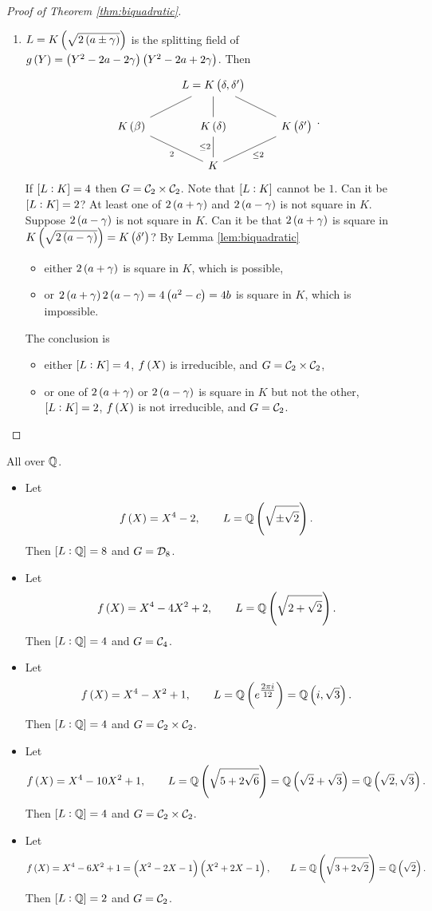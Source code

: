 \begin{proof}[Proof of Theorem \ref{thm:biquadratic}]
\begin{enumerate}
\item $ L = K\br{\sqrt{2\br{a \pm \gamma}}} $ is the splitting field of $ g\br{Y} = \br{Y^2 - 2a - 2\gamma}\br{Y^2 - 2a + 2\gamma} $. Then
$$
\begin{tikzcd}
& L = K\br{\delta, \delta'} & \\
K\br{\beta} \arrow[dash]{ur} & K\br{\delta} \arrow[dash]{u} & K\br{\delta'} \arrow[dash]{ul} \\
& K \arrow[dash]{ul}{2} \arrow[dash]{u}{\le 2} \arrow[dash]{ur}[swap]{\le 2} &
\end{tikzcd}.
$$
If $ \sbr{L : K} = 4 $ then $ G = \mathcal{C}_2 \times \mathcal{C}_2 $. Note that $ \sbr{L : K} $ cannot be $ 1 $. Can it be $ \sbr{L : K} = 2 $? At least one of $ 2\br{a + \gamma} $ and $ 2\br{a - \gamma} $ is not square in $ K $. Suppose $ 2\br{a - \gamma} $ is not square in $ K $. Can it be that $ 2\br{a + \gamma} $ is square in $ K\br{\sqrt{2\br{a - \gamma}}} = K\br{\delta'} $? By Lemma \ref{lem:biquadratic}
\begin{itemize}
\item either $ 2\br{a + \gamma} $ is square in $ K $, which is possible,
\item or $ 2\br{a + \gamma}2\br{a - \gamma} = 4\br{a^2 - c} = 4b $ is square in $ K $, which is impossible.
\end{itemize}
The conclusion is
\begin{itemize}
\item either $ \sbr{L : K} = 4 $, $ f\br{X} $ is irreducible, and $ G = \mathcal{C}_2 \times \mathcal{C}_2 $,
\item or one of $ 2\br{a + \gamma} $ or $ 2\br{a - \gamma} $ is square in $ K $ but not the other, $ \sbr{L : K} = 2 $, $ f\br{X} $ is not irreducible, and $ G = \mathcal{C}_2 $.
\end{itemize}
\end{enumerate}
\end{proof}

\begin{example*}
All over $ \mathbb{Q} $.
\begin{itemize}
\item Let
$$ f\br{X} = X^4 - 2, \qquad L = \QQ\br{\sqrt{\pm\sqrt{2}}}. $$
Then $ \sbr{L : \QQ} = 8 $ and $ G = \mathcal{D}_8 $.
\item Let
$$ f\br{X} = X^4 - 4X^2 + 2, \qquad L = \QQ\br{\sqrt{2 + \sqrt{2}}}. $$
Then $ \sbr{L : \QQ} = 4 $ and $ G = \mathcal{C}_4 $.
\item Let
$$ f\br{X} = X^4 - X^2 + 1, \qquad L = \QQ\br{e^{\tfrac{2\pi i}{12}}} = \QQ\br{i, \sqrt{3}}. $$
Then $ \sbr{L : \QQ} = 4 $ and $ G = \mathcal{C}_2 \times \mathcal{C}_2 $.
\item Let
$$ f\br{X} = X^4 - 10X^2 + 1, \qquad L = \QQ\br{\sqrt{5 + 2\sqrt{6}}} = \QQ\br{\sqrt{2} + \sqrt{3}} = \QQ\br{\sqrt{2}, \sqrt{3}}. $$
Then $ \sbr{L : \QQ} = 4 $ and $ G = \mathcal{C}_2 \times \mathcal{C}_2 $.
\item Let
$$ f\br{X} = X^4 - 6X^2 + 1 = \br{X^2 - 2X - 1}\br{X^2 + 2X - 1}, \qquad L = \QQ\br{\sqrt{3 + 2\sqrt{2}}} = \QQ\br{\sqrt{2}}. $$
Then $ \sbr{L : \QQ} = 2 $ and $ G = \mathcal{C}_2 $.
\end{itemize}
\end{example*}


